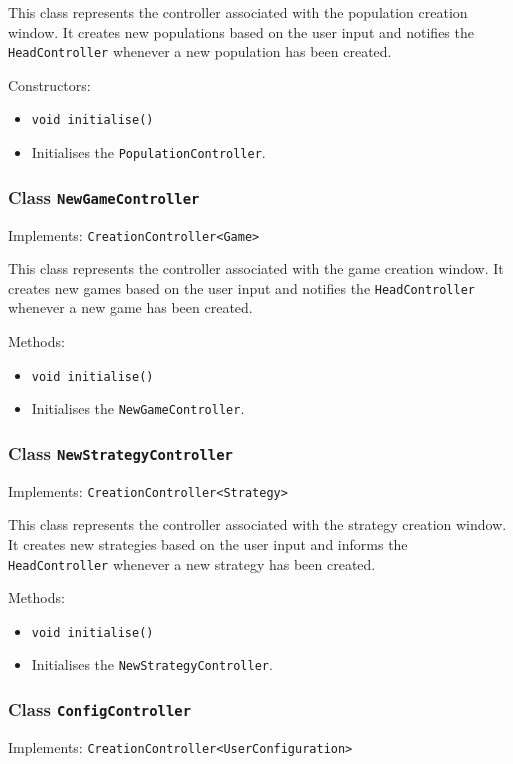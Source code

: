 \documentclass[parskip=full,11pt]{scrartcl}
\begin{document}
This class represents the controller associated with the population creation window. It creates new populations based on the user input and notifies the \texttt{HeadController} whenever a new population has been created.

Constructors:
\begin{itemize}\itemsep -10pt
	\item \texttt{void initialise()}
	\item[] Initialises the \texttt{PopulationController}.
\end{itemize}

\subsubsection{Class \texttt{NewGameController}}
Implements: \texttt{CreationController<Game>}

This class represents the controller associated with the game creation window. It creates new games based on the user input and notifies the \texttt{HeadController} whenever a new game has been created.

Methods:
\begin{itemize}\itemsep -10pt
	\item \texttt{void initialise()}
	\item[] Initialises the \texttt{NewGameController}.
\end{itemize}

\subsubsection{Class \texttt{NewStrategyController}}
Implements: \texttt{CreationController<Strategy>}

This class represents the controller associated with the strategy creation window. It creates new strategies based on the user input and informs the \texttt{HeadController} whenever a new strategy has been created.

Methods:
\begin{itemize}\itemsep -10pt
	\item \texttt{void initialise()}
	\item[] Initialises the \texttt{NewStrategyController}.
\end{itemize}

\subsubsection{Class \texttt{ConfigController}}
Implements: \texttt{CreationController<UserConfiguration>}
\end{document}
